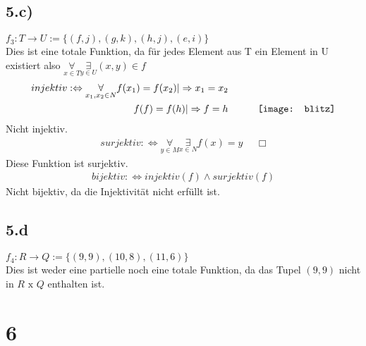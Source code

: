 \documentclass[10pt,ngerman]{scrartcl}
\begin{document}
\subsection{5.c)}
$f_3: T \longrightarrow U := \{(f , j), (g, k ), (h, j), (e, i)\}$\\
Dies ist eine totale Funktion, da für jedes Element aus T ein Element in U existiert also $\underset{x \in T}{\forall} \underset{y \in U}{\exists} (x,y) \in f$
\begin{align*}
injektiv :\Leftrightarrow \underset{x_1,x_2 \in N}{\forall} f (x_1) = f (x_2) | \Rightarrow x_1 = x_2 \\ f(f) = f(h) | \Rightarrow f = h && \qquad \vcenter{\hbox{\texttt{[image: blitz]}}}
\end{align*}
Nicht injektiv.
\begin{align*}
surjektiv :\Leftrightarrow \underset{y \in M}{\forall} \underset{x \in N}{\exists} f(x) = y && \Box
\end{align*}
Diese Funktion ist surjektiv.
\begin{align*}
 bijektiv :\Leftrightarrow injektiv (f ) \wedge surjektiv (f )
\end{align*}
Nicht bijektiv, da die Injektivität nicht erfüllt ist.
\subsection{5.d}
$f_4: R \longrightarrow Q := \{(9, 9), (10, 8), (11, 6)\}$\\
Dies ist weder eine partielle noch eine totale Funktion, da das Tupel $(9,9)$ nicht in $R \text{ x } Q$ enthalten ist.
\pagebreak
\section{6}
\end{document}
